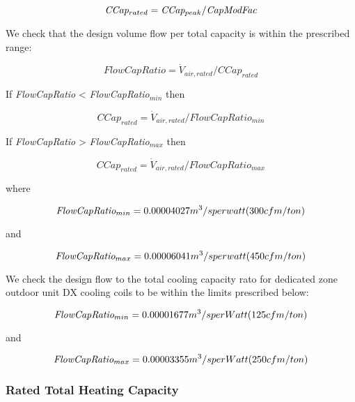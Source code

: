 \begin{equation}
\emph{CCap\(_{rated}\)} = \emph{CCap\(_{peak}\)}/ \emph{CapModFac}
\end{equation}

We check that the design volume flow per total capacity is within the prescribed range:

\begin{equation}
FlowCapRatio = \dot V_{air,rated} /CCap_{rated}
\end{equation}

If \emph{FlowCapRatio} \textless{} \emph{FlowCapRatio\(_{min}\)} then

\begin{equation}
CCap_{rated} = \dot V_{air,rated}/FlowCapRatio_{min}
\end{equation}

If \emph{FlowCapRatio} \textgreater{} \emph{FlowCapRatio\(_{max}\)} then

\begin{equation}
CCap_{rated} = \dot V_{air,rated} /FlowCapRatio_{max}
\end{equation}

where

\begin{equation}
\emph{FlowCapRatio\(_{min}\)} = 0.00004027 m^{3}/s per watt (300 cfm/ton)
\end{equation}

and

\begin{equation}
\emph{FlowCapRatio\(_{max}\)} = 0.00006041 m^{3}/s per watt (450 cfm/ton)
\end{equation}

We check the design flow to the total cooling capacity rato for dedicated zone outdoor unit DX cooling coils to be within the limits prescribed below:

\begin{equation}
\emph{FlowCapRatio\(_{min}\)} = 0.00001677 m^{3}/s per Watt (125 cfm/ton)
\end{equation}

and

\begin{equation}
\emph{FlowCapRatio\(_{max}\)} = 0.00003355 m^{3}/s per Watt (250 cfm/ton)
\end{equation}

\subsubsection{Rated Total Heating Capacity}\label{rated-total-heating-capacity-2}

